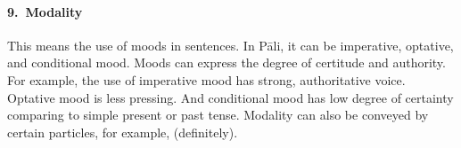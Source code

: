 \paragraph*{9.\ Modality} This means the use of moods in sentences. In P\=ali, it can be imperative, optative, and conditional mood. Moods can express the degree of certitude and authority. For example, the use of imperative mood has strong, authoritative voice. Optative mood is less pressing. And conditional mood has low degree of certainty comparing to simple present or past tense. Modality can also be conveyed by certain particles, for example,  (definitely).
